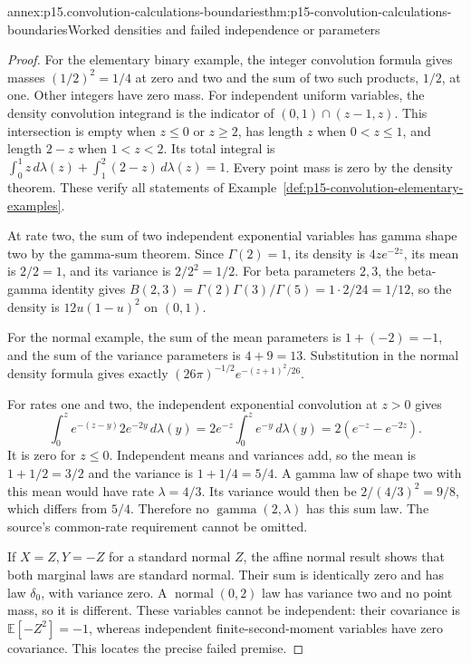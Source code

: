 \begin{annexitem}{annex:p15.convolution-calculations-boundaries}{thm:p15-convolution-calculations-boundaries}{Worked densities and failed independence or parameters}
\begin{proof}
For the elementary binary example, the integer convolution formula
gives masses \((1/2)^2=1/4\) at zero and two and the sum of
two such products, \(1/2\), at one. Other integers have zero
mass. For independent uniform variables, the density convolution
integrand is the indicator of \((0,1)\cap(z-1,z)\).
This intersection is empty when \(z\leq0\) or \(z\geq2\),
has length \(z\) when \(0<z\leq1\), and length \(2-z\)
when \(1<z<2\). Its total integral is
\(\int_0^1z\,d\lambda(z)+\int_1^2(2-z)\,d\lambda(z)=1\).
Every point mass is zero by the density theorem. These verify
all statements of Example~\ref{def:p15-convolution-elementary-examples}.

At rate two, the sum of two independent exponential variables has
gamma shape two by the gamma-sum theorem. Since \(\Gamma(2)=1\),
its density is \(4z e^{-2z}\), its mean is \(2/2=1\), and
its variance is \(2/2^2=1/2\). For beta parameters \(2,3\),
the beta-gamma identity gives
\(B(2,3)=\Gamma(2)\Gamma(3)/\Gamma(5)=1\cdot2/24=1/12\),
so the density is \(12u(1-u)^2\) on \((0,1)\).

For the normal example, the sum of the mean parameters is
\(1+(-2)=-1\), and the sum of the variance parameters is
\(4+9=13\). Substitution in the normal density formula gives
exactly \((26\pi)^{-1/2}e^{-(z+1)^2/26}\).

For rates one and two, the independent exponential convolution at
\(z>0\) gives
\[
 \int_0^z e^{-(z-y)}2e^{-2y}\,d\lambda(y)
       =2e^{-z}\int_0^z e^{-y}\,d\lambda(y)
       =2(e^{-z}-e^{-2z}).
\]
It is zero for \(z\leq0\). Independent means and variances
add, so the mean is \(1+1/2=3/2\) and the variance is
\(1+1/4=5/4\). A gamma law of shape two with this mean
would have rate \(\lambda=4/3\). Its variance would then
be \(2/(4/3)^2=9/8\), which differs from \(5/4\).
Therefore no \(\operatorname{gamma}(2,\lambda)\) has this
sum law. The source's common-rate requirement cannot be omitted.

If \(X=Z,Y=-Z\) for a standard normal \(Z\), the affine
normal result shows that both marginal laws are standard normal.
Their sum is identically zero and has law \(\delta_0\), with
variance zero. A \(\operatorname{normal}(0,2)\) law has
variance two and no point mass, so it is different. These variables
cannot be independent: their covariance is
\(\mathbb E[-Z^2]=-1\), whereas independent finite-second-moment
variables have zero covariance. This locates the precise failed premise.


\end{proof}
\end{annexitem}
